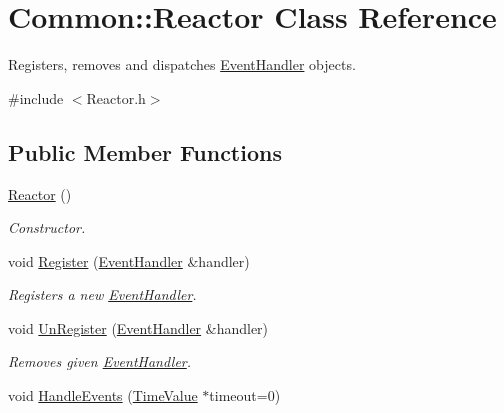\hypertarget{class_common_1_1_reactor}{\section{Common\-:\-:Reactor Class Reference}
\label{class_common_1_1_reactor}
}


Registers, removes and dispatches \hyperlink{class_common_1_1_event_handler}{Event\-Handler} objects.  




{\ttfamily \#include $<$Reactor.\-h$>$}

\subsection*{Public Member Functions}
\begin{DoxyCompactItemize}
\item 
\hypertarget{class_common_1_1_reactor_a16df779ef6429f9e6cf69389d72a2ec8}{\hyperlink{class_common_1_1_reactor_a16df779ef6429f9e6cf69389d72a2ec8}{Reactor} ()}\label{class_common_1_1_reactor_a16df779ef6429f9e6cf69389d72a2ec8}

\begin{DoxyCompactList}\small\item\em Constructor. \end{DoxyCompactList}\item 
\hypertarget{class_common_1_1_reactor_ae399a96760dc6d217c5fd601331d1980}{void \hyperlink{class_common_1_1_reactor_ae399a96760dc6d217c5fd601331d1980}{Register} (\hyperlink{class_common_1_1_event_handler}{Event\-Handler} \&handler)}\label{class_common_1_1_reactor_ae399a96760dc6d217c5fd601331d1980}

\begin{DoxyCompactList}\small\item\em Registers a new \hyperlink{class_common_1_1_event_handler}{Event\-Handler}. \end{DoxyCompactList}\item 
\hypertarget{class_common_1_1_reactor_ac95750fd117060a6c8b09d4b149da56b}{void \hyperlink{class_common_1_1_reactor_ac95750fd117060a6c8b09d4b149da56b}{Un\-Register} (\hyperlink{class_common_1_1_event_handler}{Event\-Handler} \&handler)}\label{class_common_1_1_reactor_ac95750fd117060a6c8b09d4b149da56b}

\begin{DoxyCompactList}\small\item\em Removes given \hyperlink{class_common_1_1_event_handler}{Event\-Handler}. \end{DoxyCompactList}\item 
\hypertarget{class_common_1_1_reactor_a68f0ad9661a926fbe0af29e3edb3f38b}{void \hyperlink{class_common_1_1_reactor_a68f0ad9661a926fbe0af29e3edb3f38b}{Handle\-Events} (\hyperlink{class_common_1_1_time_value}{Time\-Value} $\ast$timeout=0)}\label{class_common_1_1_reactor_a68f0ad9661a926fbe0af29e3edb3f38b}


\end{DoxyCompactItemize}
